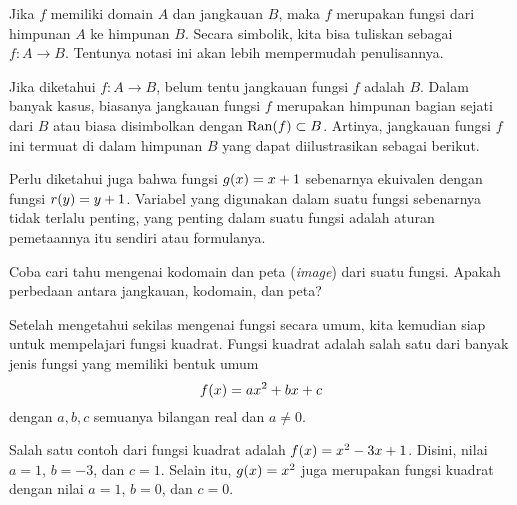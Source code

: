 \par Jika $ f $ memiliki domain $ A $ dan jangkauan $ B $, maka $ f $ merupakan fungsi dari himpunan $ A $ ke himpunan $ B $. Secara simbolik, kita bisa tuliskan sebagai $ f \colon A \to B $. Tentunya notasi ini akan lebih mempermudah penulisannya.

\begin{warningbox}
	Jika diketahui $ f \colon A \to B $, belum tentu jangkauan fungsi $ f $ adalah $ B $. Dalam banyak kasus, biasanya jangkauan fungsi $ f $ merupakan himpunan bagian sejati dari $ B $ atau biasa disimbolkan dengan $ \mathop{}\!{\operatorname{Ran}}{\left({f}\right)} \subset B $. Artinya, jangkauan fungsi $ f $ ini termuat di dalam himpunan $ B $ yang dapat diilustrasikan sebagai berikut.
	\begin{center}
	\end{center}
\end{warningbox}

\par Perlu diketahui juga bahwa fungsi $ \mathop{}\!{g}{\left({x}\right)} = x + 1 $ sebenarnya ekuivalen dengan fungsi $ \mathop{}\!{r}{\left({y}\right)} = y + 1 $. Variabel yang digunakan dalam suatu fungsi sebenarnya tidak terlalu penting, yang penting dalam suatu fungsi adalah aturan pemetaannya itu sendiri atau formulanya.

\begin{explbox}
	Coba cari tahu mengenai kodomain dan peta (\textit{image}) dari suatu fungsi. Apakah perbedaan antara jangkauan, kodomain, dan peta?
\end{explbox}

\par Setelah mengetahui sekilas mengenai fungsi secara umum, kita kemudian siap untuk mempelajari fungsi kuadrat. Fungsi kuadrat adalah salah satu dari banyak jenis fungsi yang memiliki bentuk umum
\begin{equation} \label{eq:222}
	\mathop{}\!{f}{\left({x}\right)} = ax^{2} + bx + c
\end{equation}
dengan $ a, b, c $ semuanya bilangan real dan $ a \ne 0 $.

\par Salah satu contoh dari fungsi kuadrat adalah $ \mathop{}\!{f}{\left({x}\right)} = x^{2} - 3x + 1 $. Disini, nilai $ a = 1 $, $ b = -3 $, dan $ c = 1 $. Selain itu, $ \mathop{}\!{g}{\left({x}\right)} = x^{2} $ juga merupakan fungsi kuadrat dengan nilai $ a = 1 $, $ b = 0 $, dan $ c = 0 $.

